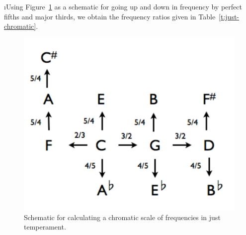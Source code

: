 \i Using Figure~\ref{f:just-chromatic-scale} as a schematic
for going up and down in frequency by perfect fifths and 
major thirds, we obtain the frequency ratios given in
Table~\ref{t:just-chromatic}.
%
\begin{figure}[htbp]
\begin{center}
\includegraphics[width=.6\textwidth]{just-chromatic-scale}
\caption{Schematic for calculating a chromatic scale of frequencies 
in just temperament.}
\label{f:just-chromatic-scale}
\end{center}
\end{figure}
%
%
